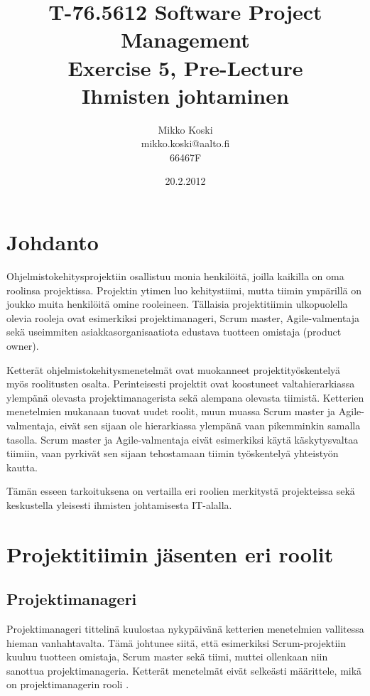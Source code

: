 \documentclass[a4paper]{article}
\begin{document}
\title{\small T-76.5612 Software Project Management \\ Exercise 5, Pre-Lecture \\ \huge Ihmisten johtaminen}
\date{20.2.2012}
\author{Mikko Koski \\ mikko.koski@aalto.fi \\ 66467F}
\maketitle

\normalsize

\section{Johdanto}

Ohjelmistokehitysprojektiin osallistuu monia henkilöitä, joilla kaikilla on oma roolinsa projektissa. Projektin ytimen luo kehitystiimi, mutta tiimin ympärillä on joukko muita henkilöitä omine rooleineen. Tällaisia projektitiimin ulkopuolella olevia rooleja ovat esimerkiksi projektimanageri, Scrum master, Agile-valmentaja sekä useimmiten asiakkasorganisaatiota edustava tuotteen omistaja (product owner).

Ketterät ohjelmistokehitysmenetelmät ovat muokanneet projektityöskentelyä myös roolitusten osalta. Perinteisesti projektit ovat koostuneet valtahierarkiassa ylempänä olevasta projektimanagerista sekä alempana olevasta tiimistä. Ketterien menetelmien mukanaan tuovat uudet roolit, muun muassa Scrum master ja Agile-valmentaja, eivät sen sijaan ole hierarkiassa ylempänä vaan pikemminkin samalla tasolla. Scrum master ja Agile-valmentaja eivät esimerkiksi käytä käskytysvaltaa tiimiin, vaan pyrkivät sen sijaan tehostamaan tiimin työskentelyä yhteistyön kautta.

Tämän esseen tarkoituksena on vertailla eri roolien merkitystä projekteissa sekä keskustella yleisesti ihmisten johtamisesta IT-alalla.

\section{Projektitiimin jäsenten eri roolit}

\subsection{Projektimanageri}

Projektimanageri tittelinä kuulostaa nykypäivänä ketterien menetelmien vallitessa hieman vanhahtavalta. Tämä johtunee siitä, että esimerkiksi Scrum-projektiin kuuluu tuotteen omistaja, Scrum master sekä tiimi, muttei ollenkaan niin sanottua projektimanageria. Ketterät menetelmät eivät selkeästi määrittele, mikä on projektimanagerin rooli \citep{augustine2005}.
\end{document}

